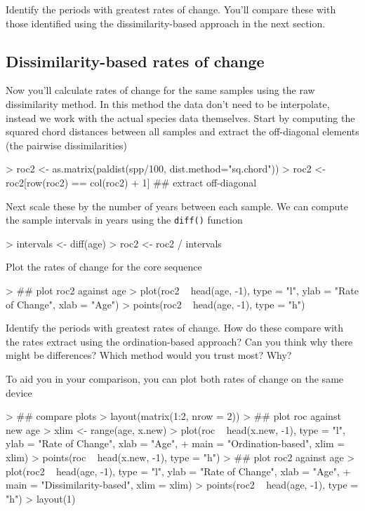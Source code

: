 \documentclass[a4paper,10pt]{article}
\begin{document}
Identify the periods with greatest rates of change. You'll compare these with
those identified using the dissimilarity-based approach in the next section.

\subsection{Dissimilarity-based rates of change}
Now you'll calculate rates of change for the same samples using the raw
dissimilarity method. In this method the data don't need to be interpolate,
instead we work with the actual species data themselves. Start by computing
the squared chord distances between all samples and extract the off-diagonal
elements (the pairwise dissimilarities)
\begin{Schunk}
\begin{Sinput}
> roc2 <- as.matrix(paldist(spp/100, dist.method="sq.chord"))
> roc2 <- roc2[row(roc2) == col(roc2) + 1] ## extract off-diagonal
\end{Sinput}
\end{Schunk}

Next scale these by the number of years between each sample. We can compute the
sample intervals in years using the \texttt{diff()} function
\begin{Schunk}
\begin{Sinput}
> intervals <- diff(age)
> roc2 <- roc2 / intervals
\end{Sinput}
\end{Schunk}

Plot the rates of change for the core sequence
\begin{Schunk}
\begin{Sinput}
> ## plot roc2 against age
> plot(roc2 ~ head(age, -1), type = "l", ylab = "Rate of Change", xlab = "Age")
> points(roc2 ~ head(age, -1), type = "h")
\end{Sinput}
\end{Schunk}

Identify the periods with greatest rates of change. How do these compare with
the rates extract using the ordination-based approach? Can you think why there
might be differences? Which method would you trust most? Why?

To aid you in your comparison, you can plot both rates of change on the same
device
\begin{Schunk}
\begin{Sinput}
> ## compare plots
> layout(matrix(1:2, nrow = 2))
> ## plot roc against new age
> xlim <- range(age, x.new)
> plot(roc ~ head(x.new, -1), type = "l", ylab = "Rate of Change", xlab = "Age",
+      main = "Ordination-based", xlim = xlim)
> points(roc ~ head(x.new, -1), type = "h")
> ## plot roc2 against age
> plot(roc2 ~ head(age, -1), type = "l", ylab = "Rate of Change", xlab = "Age",
+      main = "Dissimilarity-based", xlim = xlim)
> points(roc2 ~ head(age, -1), type = "h")
> layout(1)
\end{Sinput}
\end{Schunk}
\end{document}
